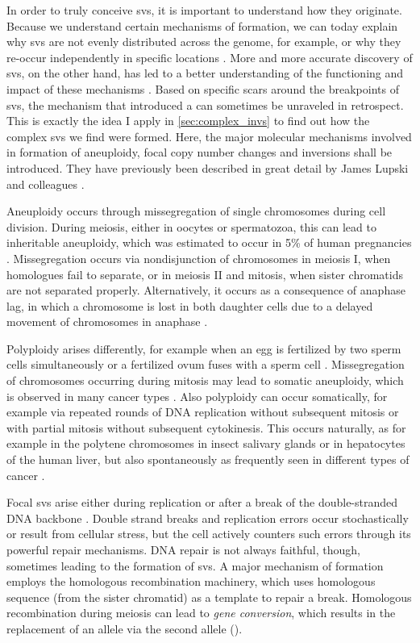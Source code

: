 In order to truly conceive \aclp{sv}, it is important to understand how they
originate. Because we understand certain mechanisms of formation, we
can today explain why \acp{sv} are not evenly distributed across the genome, for example, or
why they re-occur independently in specific locations \citep{Hastings2009}.
More and more accurate discovery of \acp{sv}, on the other hand, has led to
a better understanding of the functioning and impact of these mechanisms
\citep{Hastings2009,Abyzov2015}. Based on specific scars around the breakpoints
of \acp{sv}, the mechanism that introduced a \sv can sometimes be unraveled in
retrospect. This is exactly the idea I apply in \cref{sec:complex_invs} to find
out how the complex \acp{sv} we find were formed. Here, the major molecular
mechanisms involved in formation of aneuploidy, focal copy number changes and
inversions shall be introduced. They have previously been described in
great detail by James Lupski and colleagues \citep{Hastings2009,Carvalho2016}.

Aneuploidy occurs through missegregation of single chromosomes during cell
division. During meiosis, either in oocytes or spermatozoa, this can lead to
inheritable aneuploidy, which was estimated to occur in 5\% of human pregnancies
\citep{Templado2013}. Missegregation occurs via nondisjunction of chromosomes in
meiosis I, when homologues fail to separate, or in meiosis II and mitosis, when
sister chromatids are not separated properly. Alternatively, it occurs as a
consequence of anaphase lag, in which a chromosome is lost in both daughter
cells due to a delayed movement of chromosomes in anaphase \citep{webAneuploidy}.

Polyploidy arises differently, for example when an egg is fertilized by two
sperm cells simultaneously or a fertilized ovum fuses with a sperm cell
\citep{webAneuploidy}. Missegregation of chromosomes occurring during mitosis may
lead to somatic aneuploidy, which is observed in many cancer types
\citep{Gordon2012}. Also polyploidy can occur somatically, for example via
repeated rounds of DNA replication without subsequent mitosis or with partial
mitosis without subsequent cytokinesis. This occurs naturally, as for example
in the polytene chromosomes in insect salivary glands or in hepatocytes of the
human liver, but also spontaneously as frequently seen in different types of
cancer \citep{Davoli2011}.

Focal \acp{sv} arise either during replication or after a break of the
double-stranded DNA backbone \citep{Hastings2009}. Double strand breaks and
replication errors occur stochastically or result from cellular stress, but the
cell actively counters such errors through its powerful repair mechanisms. DNA
repair is not always faithful, though, sometimes leading to the formation of
\acp{sv}. A major mechanism of \sv formation employs the homologous
recombination machinery, which uses homologous sequence (from the sister
chromatid) as a template to repair a break. Homologous recombination during
meiosis can lead to \emph{gene conversion}, which results in the replacement of
an allele via the second allele (\loh).

